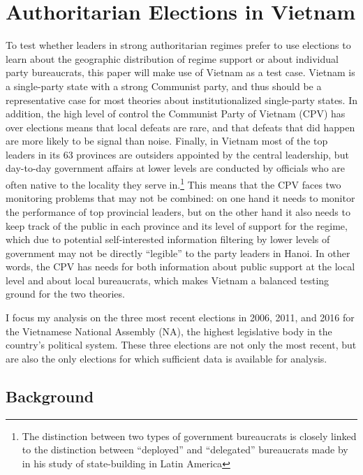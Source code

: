 \documentclass[12pt]{article}\usepackage[]{graphicx}\usepackage[]{color}
\newcommand{\1}{\mathbbm{1}}
\begin{document}
\section{Authoritarian Elections in Vietnam}
\label{sec:vietnam}
To test whether leaders in strong authoritarian regimes prefer to use elections to learn about the geographic distribution of regime support or about individual party bureaucrats, this paper will make use of Vietnam as a test case. Vietnam is a single-party state with a strong Communist party, and thus should be a representative case for most theories about institutionalized single-party states. In addition, the high level of control the Communist Party of Vietnam (CPV) has over elections \citep{MaleskySchuler2011} means that local defeats are rare, and that defeats that did happen are more likely to be signal than noise. Finally, in Vietnam most of the top leaders in its 63 provinces are outsiders appointed by the central leadership, but day-to-day government affairs at lower levels are conducted by officials who are often native to the locality they serve in.\footnote{The distinction between two types of government bureaucrats is closely linked to the distinction between ``deployed'' and ``delegated'' bureaucrats made by \cite{Soifer2015} in his study of state-building in Latin America} This means that the CPV faces two monitoring problems that may not be combined: on one hand it needs to monitor the performance of top provincial leaders, but on the other hand it also needs to keep track of the public in each province and its level of support for the regime, which due to potential self-interested information filtering by lower levels of government may not be directly ``legible'' \cite[in the words of][]{Scott1998} to the party leaders in Hanoi. In other words, the CPV has needs for both information about public support at the local level and about local bureaucrats, which makes Vietnam a balanced testing ground for the two theories.

I focus my analysis on the three most recent elections in 2006, 2011, and 2016 for the Vietnamese National Assembly (NA), the highest legislative body in the country's political system. These three elections are not only the most recent, but are also the only elections for which sufficient data is available for analysis.

\subsection{Background}
\end{document}
